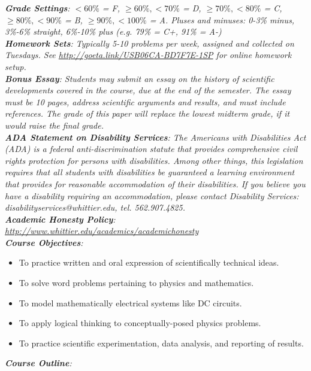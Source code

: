 \documentclass[10pt]{article}
\begin{document}
\textit{\textbf{Grade Settings}: $<60\%$ = F, $\geq 60\%, <70\%$ = D, $\geq 70\%, <80\%$ = C, $\geq 80\%, <90\%$ = B, $\geq 90\%, <100\%$ = A.  Pluses and minuses: 0-3\% minus, 3\%-6\% straight, 6\%-10\% plus (e.g. 79\% = C+, 91\% = A-)} \\
\textit{\textbf{Homework Sets}: Typically 5-10 problems per week, assigned and collected on Tuesdays.  See \url{http://goeta.link/USB06CA-BD7F7E-1SP} for online homework setup.} \\
\textit{\textbf{Bonus Essay}: Students may submit an essay on the history of scientific developments covered in the course, due at the end of the semester.  The essay must be 10 pages, address scientific arguments and results, and must include references.  The grade of this paper will replace the lowest midterm grade, if it would raise the final grade.} \\
\textit{\textbf{ADA Statement on Disability Services}: The Americans with Disabilities Act (ADA) is a federal anti-discrimination statute that provides comprehensive civil rights protection for persons with disabilities. Among other things, this legislation requires that all students with disabilities be guaranteed a learning environment that provides for reasonable accommodation of their disabilities. If you believe you have a disability requiring an accommodation, please contact Disability Services: disabilityservices@whittier.edu, tel. 562.907.4825.} \\
\textit{\textbf{Academic Honesty Policy}: \url{http://www.whittier.edu/academics/academichonesty}} \\
\textit{\textbf{Course Objectives}:}
\begin{itemize}
\item To practice written and oral expression of scientifically technical ideas.
\item To solve word problems pertaining to physics and mathematics.
\item To model mathematically electrical systems like DC circuits.
\item To apply logical thinking to conceptually-posed physics problems.
\item To practice scientific experimentation, data analysis, and reporting of results.
\end{itemize}
\clearpage
\small
\textit{\textbf{Course Outline}:}
\end{document}
